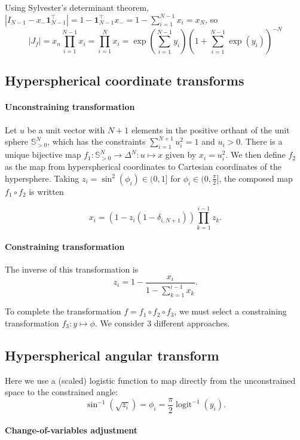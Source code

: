 \documentclass[11pt]{article}
\begin{document}
Using Sylvester's determinant theorem,
$|I_{N-1} - x_- \boldsymbol{1}_{N-1}^\top| = 1 -
\boldsymbol{1}_{N-1}^\top x_- = 1 - \sum_{i=1}^{N-1} x_i = x_N$, so
$$ |J_f| = x_n \prod_{i=1}^{N-1} x_i = \prod_{i=1}^{N} x_i = \exp\left(\sum_{i=1}^{N-1} y_i\right) \left(1 + \sum_{i=1}^{N-1} \exp(y_i)\right)^{-N}$$

\subsection{Hyperspherical coordinate transforms}
\paragraph{Unconstraining transformation}
Let $u$ be a unit vector with $N+1$ elements in the positive orthant of the unit sphere $\mathbb{S}_{>0}^N$, which has the constraints $\sum_{i=1}^{N+1} u_i^2 = 1$ and $u_i > 0$.
There is a unique bijective map $f_1\colon \mathbb{S}_{>0}^N \to \Delta^N \colon u \mapsto x$ given by $x_i = u_i^2$.
We then define $f_2$ as the map from hyperspherical coordinates to Cartesian coordinates of the hypersphere.
Taking $z_i = \sin^2(\phi_i) \in (0, 1]$ for $\phi_i \in (0, \frac{\pi}{2}]$, the composed map $f_1 \circ f_2$ is written

\[
  x_i = (1 - z_i (1 - \delta_{i,N+1})) \prod_{k=1}^{i-1} z_k.
\]
\paragraph{Constraining transformation}

The inverse of this transformation is
$$z_i = 1 - \frac{x_i}{1 - \sum_{k=1}^{i - 1} x_k}.$$

To complete the transformation $f = f_1 \circ f_2 \circ f_3$, we must select a constraining transformation $f_3: y \mapsto \phi$.
We consider 3 different approaches.

\subsection{Hyperspherical angular transform}

Here we use a (scaled) logistic function to map directly from the unconstrained space to the constrained angle:
$$\sin^{-1}(\sqrt{z_i}) = \phi_i = \frac{\pi}{2} \operatorname{logit}^{-1} (y_i).$$

\paragraph{Change-of-variables adjustment}
\end{document}
